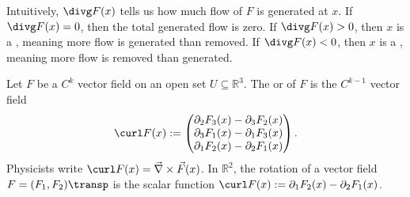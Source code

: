\begin{remark}
Intuitively, $\divg F(x)$ tells us how much flow of $F$ is generated at $x$. If $\divg F(x) = 0$, then the total generated flow is zero.
If $\divg F(x) > 0$, then $x$ is a  , meaning more flow is generated than removed.
If $\divg F(x) < 0$, then $x$ is a  , meaning more flow is removed than generated.

\begin{center}
\end{center}
\end{remark}

\begin{definition}
\label{def:rotation}
Let $F$ be a $C^k$ vector field on an open set $U \subseteq \mathbb{R}^3$. The  or  of $F$ is the $C^{k-1}$ vector field
\[\curl F(x) := \begin{pmatrix} \partial_2 F_3(x) - \partial_3 F_2(x) \\ \partial_3 F_1(x) - \partial_1 F_3(x) \\ \partial_1 F_2(x) - \partial_2 F_1(x) \end{pmatrix}.\]
Physicists write $\curl F(x) = \vec{\nabla} \times \vec{F}(x)$.
In $\mathbb{R}^2$, the rotation of a vector field $F = (F_1, F_2)\transp$ is the scalar function $\curl F(x) := \partial_1 F_2(x) - \partial_2 F_1(x)$.
\end{definition}

